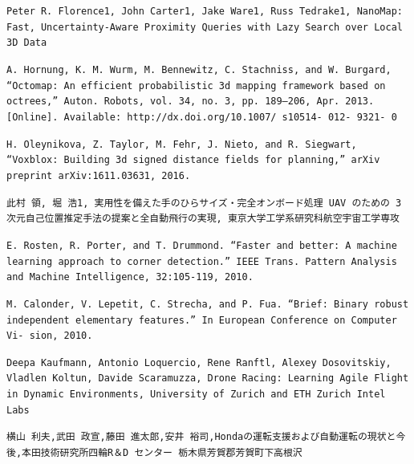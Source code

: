 \documentclass[a4j,10pt]{jsarticle}
\begin{document}
\begin{thebibliography}{99}
\texttt{Peter R. Florence1, John Carter1, Jake Ware1, Russ Tedrake1, NanoMap: Fast, Uncertainty-Aware Proximity Queries with Lazy Search over Local 3D Data}

\texttt{A. Hornung, K. M. Wurm, M. Bennewitz, C. Stachniss, and W. Burgard, “Octomap: An efficient probabilistic 3d mapping framework based on octrees,” Auton. Robots, vol. 34, no. 3, pp. 189–206, Apr. 2013. [Online]. Available: http://dx.doi.org/10.1007/ s10514- 012- 9321- 0}

\texttt{H. Oleynikova, Z. Taylor, M. Fehr, J. Nieto, and R. Siegwart, “Voxblox: Building 3d signed distance fields for planning,” arXiv preprint arXiv:1611.03631, 2016.}

\texttt{此村 領, 堀 浩1, 実用性を備えた手のひらサイズ・完全オンボード処理 UAV のための 3 次元自己位置推定手法の提案と全自動飛行の実現, 東京大学工学系研究科航空宇宙工学専攻}

\texttt{E. Rosten, R. Porter, and T. Drummond. “Faster and better: A machine learning approach to corner detection.” IEEE Trans. Pattern Analysis and Machine Intelligence, 32:105-119, 2010.}

\texttt{M. Calonder, V. Lepetit, C. Strecha, and P. Fua. “Brief: Binary robust independent elementary features.” In European Conference on Computer Vi- sion, 2010.}

\texttt{Deepa Kaufmann, Antonio Loquercio, Rene Ranftl, Alexey Dosovitskiy, Vladlen Koltun, Davide Scaramuzza, Drone Racing: Learning Agile Flight in Dynamic Environments, University of Zurich and ETH Zurich Intel Labs}

\texttt{横山 利夫,武田 政宣,藤田 進太郎,安井 裕司,Hondaの運転支援および自動運転の現状と今後,本田技術研究所四輪R＆D センター 栃木県芳賀郡芳賀町下高根沢}

\end{thebibliography}
\end{document}
